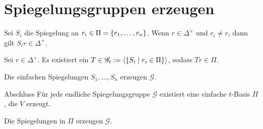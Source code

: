 \documentclass{beamer}
\begin{document}
\section{Spiegelungsgruppen erzeugen}
\begin{frame}
    \begin{satz} %
        Sei \( S_i \) die Spiegelung an 
        \( r_i \in \Pi = \{r_1, \ldots, r_n\} \).
        Wenn \( r \in \Delta^+ \) und \( r_i \neq r \), 
        dann gilt \( S_i r \in \Delta^+ \).
    \end{satz}
    \pause
    \begin{satz} %
        Sei \( r \in \Delta^+ \). Es existiert ein \( T \in 
        \mathscr{G}_t := \langle 
        \{S_i \;\vert\; r_i \in \Pi\} \rangle \), sodass 
        \( Tr \in \Pi \).
    \end{satz}\pause
    \begin{satz} %
        Die einfachen Spiegelungen \( S_1, \ldots, S_n \) 
        erzeugen \( \mathscr{G} \).
    \end{satz}
\end{frame}

\begin{frame}{Abschluss}
    Für jede endliche Spiegelungsgruppe 
    \( \mathscr{G} \) existiert eine 
    einfache \( t \)-Basis \( \Pi \), 
    die \( V \) erzeugt. 
    \pause
    
    Die Spiegelungen in 
    \( \Pi \) erzeugen \( \mathscr{G} \).
\end{frame}
\end{document}
